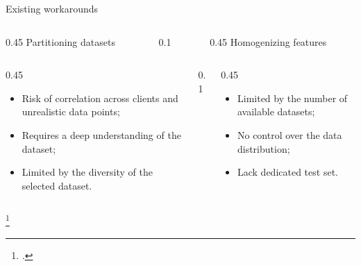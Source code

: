 \begin{frame}{Existing workarounds}
  \begin{columns}[t]
    \begin{column}{0.45\textwidth}
      \centering\large
      \alert{Partitioning datasets}~\autocite{campos_EvaluatingFederatedLearning_2022}
    \end{column}
    \begin{column}{0.1\textwidth}
      \centering
      \vs
    \end{column}
    \begin{column}{0.45\textwidth}
      \centering\large
      \alert{Homogenizing features}~\autocite{popoola_FederatedDeepLearning_2021}
    \end{column}
  \end{columns}
  \pause
  \begin{columns}[t]
    \begin{column}{0.45\textwidth}
      \begin{itemize}
        \item Risk of correlation across clients and unrealistic data points;
        \item Requires a deep understanding of the dataset;
        \item Limited by the diversity of the selected dataset.
      \end{itemize}
    \end{column}
    \begin{column}{0.1\textwidth}\end{column}
    \begin{column}{0.45\textwidth}
      \pause
      \begin{itemize}
        \item Limited by the number of available datasets;
        \item No control over the data distribution;
        \item Lack dedicated test set.
      \end{itemize}
    \end{column}
  \end{columns}

  \footcite*{campos_EvaluatingFederatedLearning_2022,popoola_FederatedDeepLearning_2021}

\end{frame}


